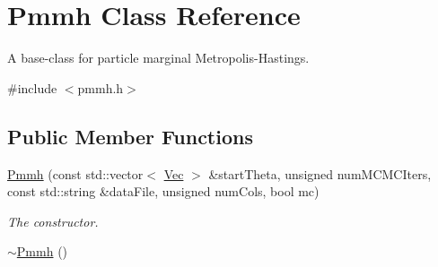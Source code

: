 \hypertarget{classPmmh}{}\section{Pmmh Class Reference}
\label{classPmmh}


A base-\/class for particle marginal Metropolis-\/\+Hastings.  




{\ttfamily \#include $<$pmmh.\+h$>$}

\subsection*{Public Member Functions}
\begin{DoxyCompactItemize}
\item 
\hyperlink{classPmmh_aa4752fceaa1b278fcadb583865bfd0b5}{Pmmh} (const std\+::vector$<$ \hyperlink{apf__filter_8h_a4c7df05c6f5e8a0d15ae14bcdbc07152}{Vec} $>$ \&start\+Theta, unsigned num\+M\+C\+M\+C\+Iters, const std\+::string \&data\+File, unsigned num\+Cols, bool mc)
\begin{DoxyCompactList}\small\item\em The constructor. \end{DoxyCompactList}\item 
\hyperlink{classPmmh_a52b058761ac6ede77eb3d8c0099e0d93}{$\sim$\+Pmmh} ()\hypertarget{classPmmh_a52b058761ac6ede77eb3d8c0099e0d93}{}\label{classPmmh_a52b058761ac6ede77eb3d8c0099e0d93}


\end{DoxyCompactItemize}
